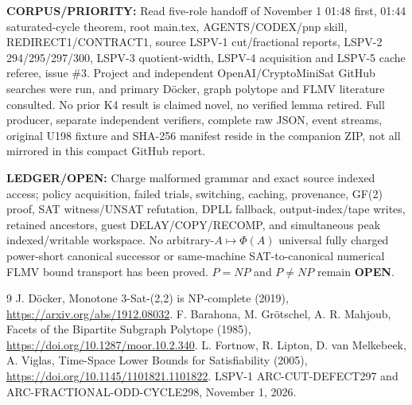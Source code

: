 \documentclass[11pt]{article}
\begin{document}
\noindent\textbf{CORPUS/PRIORITY:} Read five-role handoff of November 1 01:48 first, 01:44 saturated-cycle theorem, root main.tex, AGENTS/CODEX/pnp skill, REDIRECT1/CONTRACT1, source LSPV-1 cut/fractional reports, LSPV-2 294/295/297/300, LSPV-3 quotient-width, LSPV-4 acquisition and LSPV-5 cache referee, issue \#3. Project and independent OpenAI/CryptoMiniSat GitHub searches were run, and primary D\"ocker, graph polytope and FLMV literature consulted. No prior K4 result is claimed novel, no verified lemma retired. Full producer, separate independent verifiers, complete raw JSON, event streams, original U198 fixture and SHA-256 manifest reside in the companion ZIP, not all mirrored in this compact GitHub report.

\noindent\textbf{LEDGER/OPEN:} Charge malformed grammar and exact source indexed access; policy acquisition, failed trials, switching, caching, provenance, GF(2) proof, SAT witness/UNSAT refutation, DPLL fallback, output-index/tape writes, retained ancestors, guest DELAY/COPY/RECOMP, and simultaneous peak indexed/writable workspace. No arbitrary-$A\mapsto\Phi(A)$ universal fully charged power-short canonical successor or same-machine SAT-to-canonical numerical FLMV bound transport has been proved. $P=NP$ and $P\ne NP$ remain \textbf{OPEN}.
\begin{thebibliography}{9}
 J. D\"ocker, Monotone 3-Sat-(2,2) is NP-complete (2019), \url{https://arxiv.org/abs/1912.08032}.
 F. Barahona, M. Gr\"otschel, A. R. Mahjoub, Facets of the Bipartite Subgraph Polytope (1985), \url{https://doi.org/10.1287/moor.10.2.340}.
 L. Fortnow, R. Lipton, D. van Melkebeek, A. Viglas, Time-Space Lower Bounds for Satisfiability (2005), \url{https://doi.org/10.1145/1101821.1101822}.
 LSPV-1 ARC-CUT-DEFECT297 and ARC-FRACTIONAL-ODD-CYCLE298, November 1, 2026.
\end{thebibliography}
\end{document}

